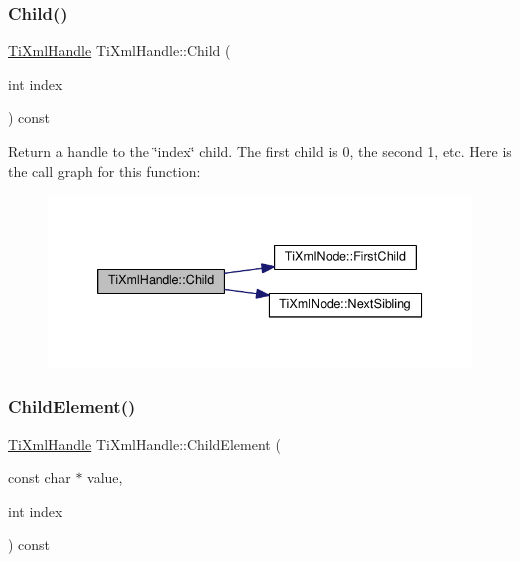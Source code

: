 \subsubsection{\texorpdfstring{Child()}{Child()}\hspace{0.1cm}{\footnotesize\ttfamily [2/2]}}
{\footnotesize\ttfamily \hyperlink{class_ti_xml_handle}{Ti\+Xml\+Handle} Ti\+Xml\+Handle\+::\+Child (\begin{DoxyParamCaption}\item[{int}]{index }\end{DoxyParamCaption}) const}

Return a handle to the \char`\"{}index\char`\"{} child. The first child is 0, the second 1, etc. Here is the call graph for this function\+:
\nopagebreak
\begin{figure}[H]
\begin{center}
\leavevmode
\includegraphics[width=339pt]{class_ti_xml_handle_a32585942abb28e03eea9c5223f38a659_cgraph}
\end{center}
\end{figure}
\mbox{\label{class_ti_xml_handle_afccc59d8a0daa8c5d78474fbed430ddb}} 
\subsubsection{\texorpdfstring{Child\+Element()}{ChildElement()}\hspace{0.1cm}{\footnotesize\ttfamily [1/2]}}
{\footnotesize\ttfamily \hyperlink{class_ti_xml_handle}{Ti\+Xml\+Handle} Ti\+Xml\+Handle\+::\+Child\+Element (\begin{DoxyParamCaption}\item[{const char $\ast$}]{value,  }\item[{int}]{index }\end{DoxyParamCaption}) const}

